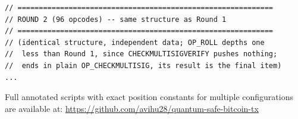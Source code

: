 \documentclass[11pt, a4paper]{article}
\begin{document}
\begin{lstlisting}[language={}, numbers=none, basicstyle=\scriptsize\ttfamily]
// ============================================================
// ROUND 2 (96 opcodes) -- same structure as Round 1
// ============================================================
// (identical structure, independent data; OP_ROLL depths one
//  less than Round 1, since CHECKMULTISIGVERIFY pushes nothing;
//  ends in plain OP_CHECKMULTISIG, its result is the final item)
...
\end{lstlisting}

\noindent Full annotated scripts with exact position constants for multiple configurations are available at: \url{https://github.com/avihu28/quantum-safe-bitcoin-tx}
\end{document}
